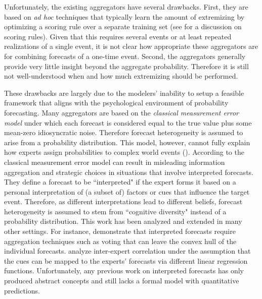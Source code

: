 \documentclass[11pt]{article}
\theoremstyle{definition}
\theoremstyle{definition}
\begin{document}
Unfortunately, the existing aggregators have several drawbacks. First, they are based on \textit{ad hoc} techniques that typically learn the amount of extremizing by optimizing a scoring rule over a separate training set (see \cite{Gneiting04strictlyproper} for a discussion on scoring rules). Given that this requires several events or at least repeated realizations of a single event, it is not clear how appropriate these aggregators are for combining forecasts of a one-time event. 
Second, the aggregators generally provide very little insight beyond the aggregate probability. Therefore it is still not well-understood when and how much extremizing should be performed. 


These drawbacks are largely due to the modelers' inability to setup a feasible framework that aligns with the psychological environment of probability forecasting. Many aggregators are based on the \textit{classical measurement error model} under which each forecast is considered equal to the true value plus some mean-zero idiosyncratic noise. Therefore forecast heterogeneity is assumed to arise from a probability distribution. This model, however, cannot fully explain how experts assign probabilities to complex world events (\cite{parunak2013exploiting}). According to \cite{hong2009interpreted} the classical measurement error model can result in misleading information aggregation and strategic choices in situations that involve interpreted forecasts. They define a forecast to be ``interpreted" if the expert forms it based on a personal interpretation of (a subset of) factors or cues that influence the target event. Therefore, as different interpretations lead to different beliefs, forecast heterogeneity is assumed to stem from ``cognitive diversity" instead of a probability distribution. This work has been analyzed and extended in many other settings. For instance, \cite{parunak2013characterizing} demonstrate that interpreted forecasts require aggregation techniques such as voting that can leave the convex hull of the individual forecasts. \cite{broomell2009experts} analyze inter-expert correlation under the assumption that the cues can be mapped to the experts' forecasts via different linear regression functions. Unfortunately, any previous work on interpreted forecasts has only produced abstract concepts and still lacks a formal model with quantitative predictions. 
\end{document}
